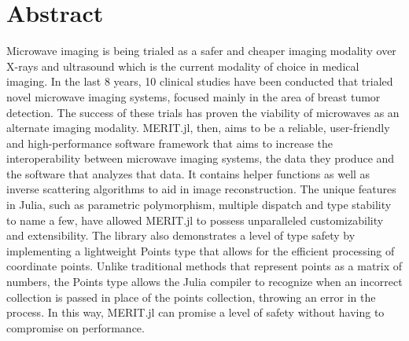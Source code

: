 \chapter*{Abstract}
Microwave imaging is being trialed as a safer and cheaper imaging modality over X-rays and ultrasound which is the
current modality of choice in medical imaging. In the last 8 years, 10 clinical studies have been conducted that trialed
novel microwave imaging systems, focused mainly in the area of breast tumor detection. The success of these trials has
proven the viability of microwaves as an alternate imaging modality. MERIT.jl, then, aims to be a reliable,
user-friendly and high-performance software framework that aims to increase the interoperability between microwave
imaging systems, the data they produce and the software that analyzes that data. It contains helper functions as well as
inverse scattering algorithms to aid in image reconstruction. The unique features in Julia, such as parametric
polymorphism, multiple dispatch and type stability to name a few, have allowed MERIT.jl to possess unparalleled
customizability and extensibility. The library also demonstrates a level of type safety by implementing a lightweight
Points type that allows for the efficient processing of coordinate points. Unlike traditional methods that represent
points as a matrix of numbers, the Points type allows the Julia compiler to recognize when an incorrect collection is
passed in place of the points collection, throwing an error in the process. In this way, MERIT.jl can promise a level of
safety without having to compromise on performance.
\newpage
